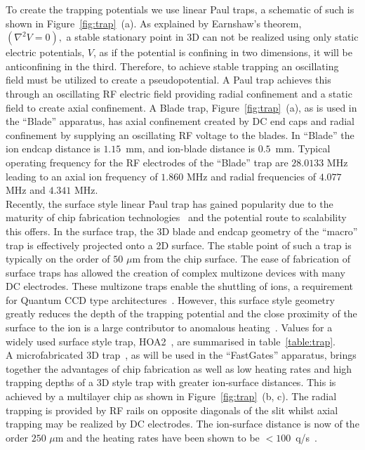 \documentclass[12pt]{iopart}
\begin{document}
To create the trapping potentials we use linear
Paul traps, a schematic of such is shown in
Figure~\ref{fig:trap}~(a). As explained by Earnshaw's theorem,
$(\nabla^2 V = 0),$
a stable stationary point in 3D can not be realized using only static
electric potentials, $V$, as if the potential is confining in two
dimensions, it will be anticonfining in the third. Therefore, to
achieve stable trapping an oscillating field must be utilized to
create a pseudopotential.
A Paul trap achieves this through an oscillating RF electric field
providing radial confinement and a static field to create axial
confinement.
A Blade trap, Figure~\ref{fig:trap}~(a), as is used in the ``Blade''
apparatus, has axial confinement created by DC end caps and radial
confinement by supplying an oscillating RF voltage to the blades. In
``Blade'' the ion endcap distance is $1.15$~mm, and ion-blade distance
is $0.5$~mm. Typical operating frequency for the RF electrodes of the
``Blade'' trap are $28.0133$ MHz leading to an axial ion frequency of
$1.860$ MHz and radial frequencies of $4.077$ MHz and $4.341$
MHz.\\ Recently, the surface style linear Paul trap has gained
popularity due to the maturity of chip fabrication technologies~\cite{allcock_surface_2011}
and the potential route to scalability this offers. In the surface
trap, the 3D blade and endcap geometry of the ``macro'' trap is
effectively projected onto a 2D surface. The stable point of such a
trap is typically on the order of $50$ $\mu$m from the chip
surface. The ease of fabrication of surface traps has allowed the
creation of complex multizone devices with many DC electrodes.  These
multizone traps enable the shuttling of ions, a requirement for
Quantum CCD type architectures~\cite{kielpinski_architecture_2002}. However, this surface style
geometry greatly reduces the depth of the trapping potential and the
close proximity of the surface to the ion is a large contributor to
anomalous heating~\cite{turchette_heating_2000}. Values for a widely used surface style trap,
HOA2~\cite{maunz_high_2016}, are summarised in
table~\ref{table:trap}.\\ A microfabricated 3D
trap~\cite{see_fabrication_2013, wilpers_monolithic_2012}, as will be
used in the ``FastGates'' apparatus, brings together the advantages of
chip fabrication as well as low heating rates and high trapping depths
of a 3D style trap with greater ion-surface distances. This is
achieved by a multilayer chip as shown in Figure~\ref{fig:trap}~(b,
c). The radial trapping is provided by RF rails on opposite diagonals
of the slit whilst axial trapping may be realized by DC
electrodes. The ion-surface distance is now of the order $250$ $\mu$m
and the heating rates have been shown to be $<
100$~q/s~\cite{choonee_silicon_2017}.
\end{document}
